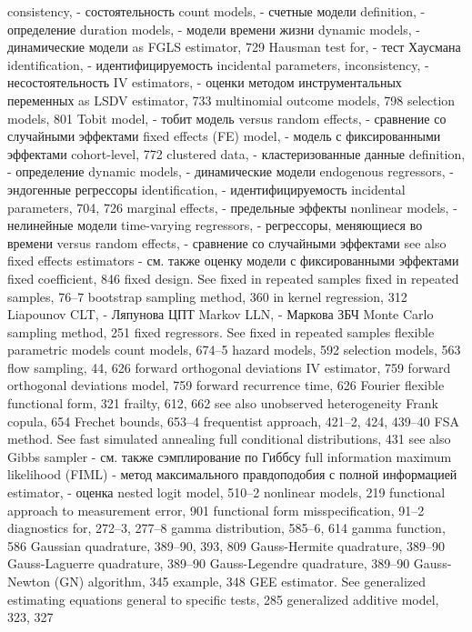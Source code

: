 consistency, - состоятельность
count models, - счетные модели
definition, - определение
duration models, - модели времени жизни
dynamic models, - динамические модели 
as FGLS estimator, 729
Hausman test for, - тест Хаусмана
identification, - идентифицируемость
incidental parameters,
inconsistency, - несостоятельность 
IV estimators, - оценки методом инструментальных переменных
as LSDV estimator, 733 
multinomial outcome models, 798 selection models, 801
Tobit model, - тобит модель
versus random effects, - сравнение со случайными эффектами
fixed effects (FE) model, - модель с фиксированными эффектами
cohort-level, 772
clustered data, - кластеризованные данные
definition, - определение
dynamic models, - динамические модели 
endogenous regressors, - эндогенные регрессоры
identification, - идентифицируемость
incidental parameters, 704, 726
marginal effects, - предельные эффекты
nonlinear models, - нелинейные модели 
time-varying regressors, - регрессоры, меняющиеся во времени
versus random effects, - сравнение со случайными эффектами
see also fixed effects estimators - см. также оценку модели с фиксированными эффектами
fixed coefficient, 846
fixed design. See fixed in repeated samples fixed in repeated samples, 76–7
bootstrap sampling method, 360 
in kernel regression, 312 
Liapounov CLT, - Ляпунова ЦПТ
Markov LLN, - Маркова ЗБЧ
Monte Carlo sampling method, 251
fixed regressors. See fixed in repeated samples flexible parametric models
count models, 674–5 hazard models, 592 selection models, 563
flow sampling, 44, 626
forward orthogonal deviations IV estimator, 759 forward orthogonal deviations model, 759 forward recurrence time, 626
Fourier flexible functional form, 321
frailty, 612, 662
see also unobserved heterogeneity Frank copula, 654
Frechet bounds, 653–4
frequentist approach, 421–2, 424, 439–40 FSA method. See fast simulated annealing full conditional distributions, 431
see also Gibbs sampler - см. также сэмплирование по Гиббсу
full information maximum likelihood (FIML) - метод максимального правдоподобия с полной информацией
estimator, - оценка
nested logit model, 510–2 nonlinear models, 219
functional approach
to measurement error, 901
functional form misspecification, 91–2 diagnostics for, 272–3, 277–8
gamma distribution, 585–6, 614 gamma function, 586
Gaussian quadrature, 389–90, 393, 809 Gauss-Hermite quadrature, 389–90 Gauss-Laguerre quadrature, 389–90 Gauss-Legendre quadrature, 389–90
Gauss-Newton (GN) algorithm, 345 example, 348
GEE estimator. See generalized estimating equations general to specific tests, 285
generalized additive model, 323, 327
